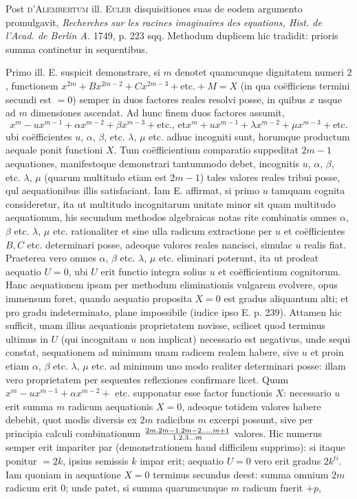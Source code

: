 \documentclass[twoside,12pt, showframe]{memoir}
\let\oldfrac\frac
\def\frac#1#2{\mathchoice{\tfrac{#1}{#2}}{\oldfrac{#1}{#2}}{\genfrac{}{}{}{2}{#1}{#2\mathstrut}}{\genfrac{}{}{}{3}{#1}{#2\mathstrut}}}
\begin{document}
Post \textsc{d'Alembertum} ill. \textsc{Euler} disquisitiones suas de eodem argumento promulgavit, \textit{Recherches sur les racines imaginaires des equations, Hist. de l'Acad. de Berlin A.} 1749, p. 223 sqq. Methodum duplicem hic tradidit: prioris summa continetur in sequentibus.

Primo ill. \textsc{E.} suspicit demonstrare, si \(m\) denotet quamcunque dignitatem numeri \(2\), functionem \(x^{2m} + Bx^{2m-2} + C x^{2m-3} + \text{etc{.}} + M = X\) (in qua co\"efficiens termini secundi est \(= 0\)) semper in duos factores reales resolvi posse, in quibus \(x\) usque ad \(m\) dimensiones ascendat.  Ad hunc finem duos factores assumit, \[x^m - u x^{m-1} + \alpha x^{m-2} + \beta x^{m-3} + \text{etc{.}, et} x^m + u x^{m-1}+\lambda x^{m-2} + \mu x^{m-3} + \text{etc{.}} \] ubi co\"efficientes \(u\), \(\alpha\), \(\beta\), etc{.} \(\lambda\), \(\mu\) etc{.} adhuc incogniti sunt, horumque productum aequale ponit functioni \(X\). Tum co\"efficientium comparatio suppeditat \(2m-1\) aequationes, manifestoque demonstrari tantummodo debet, incognitis \(u\), \(\alpha\), \(\beta\), etc{.} \(\lambda\), \(\mu\) (quarum multitudo etiam est \(2m -1\)) tales valores reales tribui posse, qul aequationibus illis satisfaciant. Iam \textsc{E.} affirmat, si primo \(u\) tamquam cognita consideretur, ita ut multitudo incognitarum unitate minor sit quam multitudo aequationum, his secundum methodos algebraicas notas rite combinatis omnes \(\alpha\), \(\beta\) etc{.} \(\lambda\), \(\mu\) etc{.} rationaliter et sine ulla radicum extractione per \(u\) et co\"efficientes \(B, C\) etc{.} determinari posse, adeoque valores reales nancisci, simulac \(u\) realis fiat. Praeterea vero omnes \(\alpha\), \(\beta\) etc{.} \(\lambda\), \(\mu\) etc{.} eliminari poterunt, ita ut prodeat aequatio \(U = 0\), ubi \(U\) erit functio integra solius \(u\) et co\"efficientium cognitorum. Hanc aequationem ipsam per methodum eliminationis vulgarem evolvere, opus immensum foret, quando aequatio proposita \(X = 0\)  est gradus aliquantum alti; et pro gradu indeterminato, plane impossibile (iudice ipso \textsc{E.} p. 239). Attamen hic sufficit, unam illius aequationis proprietatem novisse, scilicet quod terminus ultimus in \(U\) (qui incognitam \(u\) non implicat) necessario est negativus, unde sequi constat, aequationem ad minimum unam radicem realem habere, sive \(u\) et proin etiam  \(\alpha\), \(\beta\) etc{.} \(\lambda\), \(\mu\) etc{.} ad minimum uno modo realiter determinari posse: illam vero proprietatem per sequentes reflexiones confirmare licet.  Quum \(x^m - u x^{m-1}+\alpha x^{m-2} +\) etc{.} supponatur esse factor functionis \(X\):  necessario \(u\) erit summa \(m\) radicum aequationis \(X = 0\), adeoque totidem valores habere debebit, quot modis diversis ex \(2m\) radicibus \(m\) excerpi possunt, sive per principia calculi combinationum \(\frac{2m . 2m-1 . 2m-2 . \dots . m+1}{1.2.3 \dots m}\) valores.   Hic numerus semper erit impariter par (demonstrationem haud difficilem supprimo): si itaque ponitur \(= 2k\), ipsius semissis \(k\) impar erit; aequatio \(U= 0\) vero erit gradus \(2k^{ti}\). Iam quoniam in aequatione \(X= 0\) terminus secundus deest: summa omnium \(2m\) radicum erit \(0\); unde patet, si summa quarumcunque \(m\) radicum fuerit \(+p\), 
\end{document}
